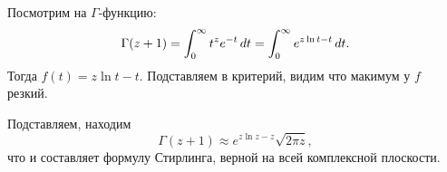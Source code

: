 Посмотрим на $\Gamma$-функцию:
\begin{equation*}
    \Gamma(z+1) = \int_{0}^{\infty}  t^{z} e^{-t} \, d t  = \int_0^\infty 
    e^{z \ln t - t} \, d t.
\end{equation*}
Тогда $f(t) = z \ln t - t$. Подставляем в критерий, видим что макимум у $f$ резкий.

Подставляем, находим
\begin{equation*}
    \Gamma(z+1) \approx e^{z \ln z - z} \sqrt{2 \pi z},
\end{equation*}
что и составляет формулу Стирлинга, верной на всей комплексной плоскости.













